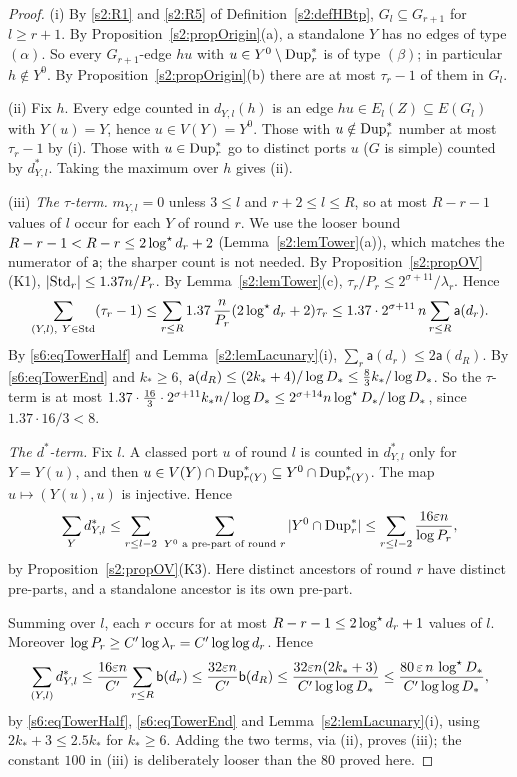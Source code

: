 \begin{proof}
(i) By \ref{s2:R1} and \ref{s2:R5} of Definition~\ref{s2:defHBtp}, $G_{l}\subseteq G_{r+1}$ for $l\ge r+1$. By Proposition~\ref{s2:propOrigin}(a), a standalone $Y$ has no edges of type $(\alpha)$. So every $G_{r+1}$-edge $hu$ with $u\in Y^0\setminus\mathrm{Dup}^{*}_r$ is of type $(\beta)$; in particular $h\notin Y^0$. By Proposition~\ref{s2:propOrigin}(b) there are at most $\tau_r-1$ of them in $G_l$.

(ii) Fix $h$. Every edge counted in $d_{Y,l}(h)$ is an edge $hu\in E_l(Z)\subseteq E(G_l)$ with $Y(u)=Y$, hence $u\in V(Y)=Y^0$. Those with $u\notin\mathrm{Dup}^{*}_r$ number at most $\tau_r-1$ by (i). Those with $u\in\mathrm{Dup}^{*}_r$ go to distinct ports $u$ ($G$ is simple) counted by $d^*_{Y,l}$. Taking the maximum over $h$ gives (ii).

(iii) \emph{The $\tau$-term.} $m_{Y,l}=0$ unless $3\le l$ and $r+2\le l\le R$, so at most $R-r-1$ values of $l$ occur for each $Y$ of round $r$. We use the looser bound $R-r-1<R-r\le2\log^{\star} d_r+2$ (Lemma~\ref{s2:lemTower}(a)), which matches the numerator of $\mathsf a$; the sharper count is not needed. By Proposition~\ref{s2:propOV}(K1), $|\mathrm{Std}_r|\le1.37n/P_r$. By Lemma~\ref{s2:lemTower}(c), $\tau_r/P_r\le2^{\sigma+11}/\lambda_r$. Hence
\[
\sum_{(Y,l),\ Y\in\Std}(\tau_r-1)\le\sum_{r\le R}1.37\,\frac{n}{P_r}(2\logs d_r+2)\tau_r\le1.37\cdot2^{\sigma+11}\,n\sum_{r\le R}\mathsf a(d_r).
\]
By \eqref{s6:eqTowerHalf} and Lemma~\ref{s2:lemLacunary}(i), $\sum_r\mathsf a(d_r)\le2\mathsf a(d_R)$. By \eqref{s6:eqTowerEnd} and $k_*\ge6$, $\mathsf a(d_R)\le(2k_*+4)/\log D_{*}\le\tfrac83k_*/\log D_{*}$. So the $\tau$-term is at most $1.37\cdot\tfrac{16}{3}\cdot2^{\sigma+11}k_*n/\log D_{*}\le2^{\sigma+14}n\log^{\star}D_{*}/\log D_{*}$, since $1.37\cdot16/3<8$.

\emph{The $d^*$-term.} Fix $l$. A classed port $u$ of round $l$ is counted in $d^*_{Y,l}$ only for $Y=Y(u)$, and then $u\in V(Y)\cap\mathrm{Dup}^{*}_{r(Y)}\subseteq Y^0\cap\mathrm{Dup}^{*}_{r(Y)}$. The map $u\mapsto(Y(u),u)$ is injective. Hence
\[
\sum_Yd^*_{Y,l}\le\sum_{r\le l-2}\ \sum_{Y^0\text{ a pre-part of round }r}|Y^0\cap\Dups_r|\le\sum_{r\le l-2}\frac{16\eps n}{\log P_r},
\]
by Proposition~\ref{s2:propOV}(K3). Here distinct ancestors of round $r$ have distinct pre-parts, and a standalone ancestor is its own pre-part.

Summing over $l$, each $r$ occurs for at most $R-r-1\le2\log^{\star} d_r+1$ values of $l$. Moreover $\log P_r\ge C'\log\lambda_r=C'\log\log d_r$. Hence
\[
\sum_{(Y,l)}d^*_{Y,l}\le\frac{16\varepsilon n}{C'}\sum_{r\le R}\mathsf b(d_r)\le\frac{32\varepsilon n}{C'}\mathsf b(d_R)\le\frac{32\varepsilon n(2k_*+3)}{C'\log\log D_{*}}\le\frac{80\,\varepsilon\,n\,\log^{\star}D_{*}}{C'\log\log D_{*}},
\]
by \eqref{s6:eqTowerHalf}, \eqref{s6:eqTowerEnd} and Lemma~\ref{s2:lemLacunary}(i), using $2k_*+3\le2.5k_*$ for $k_*\ge6$. Adding the two terms, via (ii), proves (iii); the constant $100$ in (iii) is deliberately looser than the $80$ proved here.


\end{proof}
